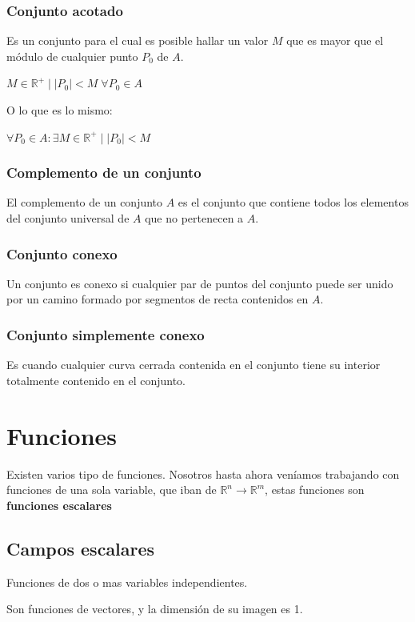 \documentclass[12pt]{article}
\begin{document}
\subsubsection{Conjunto acotado}
Es un conjunto para el cual es posible hallar un valor $ M $ que es mayor que el módulo de cualquier punto $ P_{0} $ de $ A $.

$ M \in \mathbb{R}^{+} \mid \left|P_{0}\right| < M \; \forall P_{0} \in A $

O lo que es lo mismo:

$ \forall P_{0} \in A: \exists M \in \mathbb{R}^{+} \mid \left|P_{0}\right| < M $

\subsubsection{Complemento de un conjunto}
El complemento de un conjunto $ A $ es el conjunto que contiene todos los elementos del conjunto universal de $ A $ que no pertenecen a $ A $.

\subsubsection{Conjunto conexo}
Un conjunto es conexo si cualquier par de puntos del conjunto puede ser unido por un camino formado por segmentos de recta contenidos en $ A $.

\subsubsection{Conjunto simplemente conexo}
Es cuando cualquier curva cerrada contenida en el conjunto tiene su interior totalmente contenido en el conjunto.


\section{Funciones}
Existen varios tipo de funciones. Nosotros hasta ahora veníamos trabajando con funciones de una sola variable, que iban de $ \mathbb{{R}}^n \to \mathbb{{R}}^m $, estas funciones son \textbf{funciones escalares}

\subsection*{Campos escalares}
Funciones de dos o mas variables independientes.

Son funciones de vectores, y la dimensión de su imagen es 1.
\end{document}
